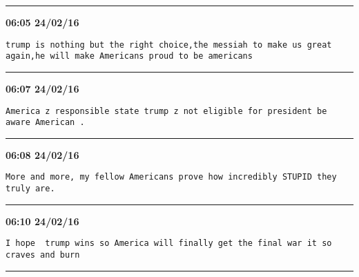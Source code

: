 \hrule%

\begin{adjustwidth}{0cm}{0cm}
\footnotesize \textbf{06:05 24/02/16}

\begin{lstlisting}[breaklines, breakatwhitespace, basicstyle=\small, frame=leftline]
trump is nothing but the right choice,the messiah to make us great again,he will make Americans proud to be americans
\end{lstlisting}
\end{adjustwidth}

\hrule%

\begin{adjustwidth}{0cm}{0cm}
\footnotesize \textbf{06:07 24/02/16}

\begin{lstlisting}[breaklines, breakatwhitespace, basicstyle=\small, frame=leftline]
America z responsible state trump z not eligible for president be aware American .
\end{lstlisting}
\end{adjustwidth}

\hrule%

\begin{adjustwidth}{0cm}{0cm}
\footnotesize \textbf{06:08 24/02/16}

\begin{lstlisting}[breaklines, breakatwhitespace, basicstyle=\small, frame=leftline]
More and more, my fellow Americans prove how incredibly STUPID they truly are.
\end{lstlisting}
\end{adjustwidth}

\hrule%

\begin{adjustwidth}{0cm}{0cm}
\footnotesize \textbf{06:10 24/02/16}

\begin{lstlisting}[breaklines, breakatwhitespace, basicstyle=\small, frame=leftline]
I hope  trump wins so America will finally get the final war it so craves and burn
\end{lstlisting}
\end{adjustwidth}

\hrule%

